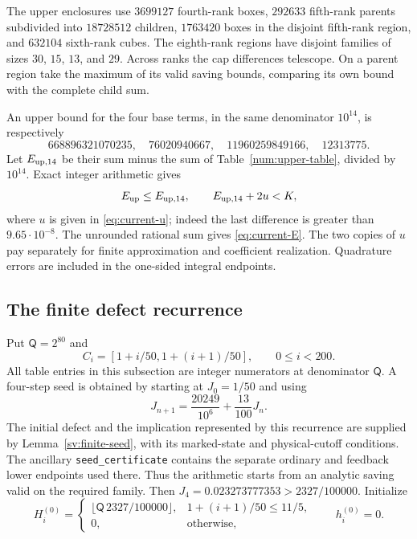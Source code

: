 The upper enclosures use $3699127$ fourth-rank boxes,
$292633$ fifth-rank parents subdivided into $18728512$ children,
$1763420$ boxes in the disjoint fifth-rank region, and $632104$
sixth-rank cubes. The eighth-rank regions have disjoint families
of sizes $30$, $15$, $13$, and $29$. Across ranks the cap
differences telescope. On a parent region take the maximum of its
valid saving bounds, comparing its own bound with the complete
child sum.

An upper bound for the four base terms, in the same denominator
$10^{14}$, is respectively
\[
 668896321070235,\quad76020940667,\quad
 11960259849166,\quad12313775.
\]
Let $E_{\rm up,14}$ be their sum minus the sum of Table~\ref{num:upper-table},
divided by $10^{14}$.  Exact integer arithmetic gives
\[
 E_{\rm up}\le E_{\rm up,14},\qquad E_{\rm up,14}+2u<K,
\]
where $u$ is given in \eqref{eq:current-u}; indeed the last difference
is greater than $9.65\cdot10^{-8}$.  The unrounded rational sum
gives \eqref{eq:current-E}.  The two copies of $u$ pay separately
for finite approximation and coefficient realization.  Quadrature errors are included in the one-sided integral endpoints.

\subsection{The finite defect recurrence}
Put $\mathsf Q=2^{80}$ and
\[
 C_i=[1+i/50,1+(i+1)/50],\qquad 0\le i<200.
\]
All table entries in this subsection are integer numerators at
denominator $\mathsf Q$.  A four-step seed is obtained by starting at
$J_0=1/50$ and using
\[
 J_{n+1}=\frac{20249}{10^6}+\frac{13}{100}J_n.
\]
The initial defect and the implication represented by this recurrence
are supplied by Lemma~\ref{sv:finite-seed}, with its marked-state and
physical-cutoff conditions. The ancillary \texttt{seed\_certificate}
contains the separate ordinary and feedback lower endpoints used
there. Thus the arithmetic starts from an analytic saving valid on
the required family. Then $J_4=0.023273777353>2327/100000$. Initialize
\begin{equation}
 H_i^{(0)}=
 \begin{cases}
 \lfloor \mathsf Q\,2327/100000\rfloor,&1+(i+1)/50\le11/5,\\
 0,&\text{otherwise},
 \end{cases}
 \qquad h_i^{(0)}=0.
 \label{num:table-seed}
\end{equation}

